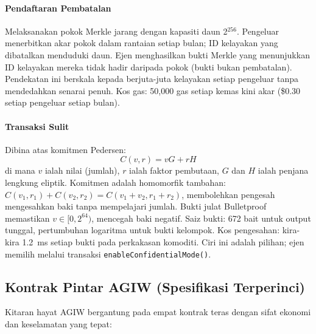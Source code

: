 \documentclass[11pt]{article}
\begin{document}
\paragraph{Pendaftaran Pembatalan} Melaksanakan pokok Merkle jarang dengan kapasiti daun 2$^{256}$. Pengeluar menerbitkan akar pokok dalam rantaian setiap bulan; ID kelayakan yang dibatalkan menduduki daun. Ejen menghasilkan bukti Merkle yang menunjukkan ID kelayakan mereka tidak hadir daripada pokok (bukti bukan pembatalan). Pendekatan ini berskala kepada berjuta-juta kelayakan setiap pengeluar tanpa mendedahkan senarai penuh. Kos gas: 50,000 gas setiap kemas kini akar (\$0.30 setiap pengeluar setiap bulan).

\paragraph{Transaksi Sulit} Dibina atas komitmen Pedersen:
\begin{equation}
C(v, r) = vG + rH
\end{equation}
di mana $v$ ialah nilai (jumlah), $r$ ialah faktor pembutaan, $G$ dan $H$ ialah penjana lengkung eliptik. Komitmen adalah homomorfik tambahan: $C(v_1, r_1) + C(v_2, r_2) = C(v_1 + v_2, r_1 + r_2)$, membolehkan pengesah mengesahkan baki tanpa mempelajari jumlah. Bukti julat Bulletproof memastikan $v \in [0, 2^{64})$, mencegah baki negatif. Saiz bukti: 672 bait untuk output tunggal, pertumbuhan logaritma untuk bukti kelompok. Kos pengesahan: kira-kira 1.2~ms setiap bukti pada perkakasan komoditi. Ciri ini adalah pilihan; ejen memilih melalui transaksi \texttt{enableConfidentialMode()}.

\subsection{Kontrak Pintar AGIW (Spesifikasi Terperinci)}
\label{sec:agiw-contracts}
Kitaran hayat AGIW bergantung pada empat kontrak teras dengan sifat ekonomi dan keselamatan yang tepat:
\end{document}
